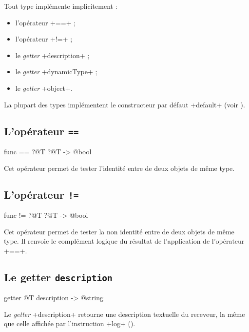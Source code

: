 Tout type implémente implicitement :
\begin{itemize}
  \item l'opérateur \ggst+==+ ;
  \item l'opérateur \ggst+!=+ ;
  \item le \emph{getter} \ggst+description+ ;
  \item le \emph{getter} \ggst+dynamicType+ ;
  \item le \emph{getter} \ggst+object+.
\end{itemize}

La plupart des types implémentent le constructeur par défaut \ggst+default+ (voir ).


\subsection{L'opérateur \texttt{==}}

\begin{galgas3}
func == ?@T ?@T -> @bool
\end{galgas3}

Cet opérateur permet de tester l'identité entre de deux objets de même type.

\subsection{L'opérateur \texttt{!=}}

\begin{galgas3}
func != ?@T ?@T -> @bool
\end{galgas3}

Cet opérateur permet de tester la non identité entre de deux objets de même type. Il renvoie le complément logique du résultat de l'application de l'opérateur \ggst+==+.





\subsection{Le getter \texttt{description}}

\begin{galgas3}
getter @T description -> @string
\end{galgas3}

Le \emph{getter} \ggst+description+ retourne une description textuelle du receveur, la même que celle affichée par l'instruction \ggst+log+ ().



